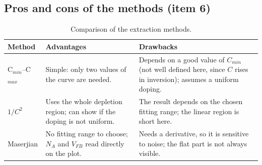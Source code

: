 \subsection{Pros and cons of the methods (item 6)}\label{sec:mis-methods}
\begin{table}[H]
\centering\small
\caption{Comparison of the extraction methods.}\label{tab:methods}
\begin{tabularx}{\linewidth}{p{2.4cm}XX}
\toprule
Method & Advantages & Drawbacks\\
\midrule
C$_{min}$--C$_{max}$ & Simple: only two values of the curve are needed. &
Depends on a good value of $C_{min}$ (not well defined here, since $C$ rises in inversion);
assumes a uniform doping.\\
$1/C^2$ & Uses the whole depletion region; can show if the doping is not uniform. &
The result depends on the chosen fitting range; the linear region is short here.\\
Maserjian & No fitting range to choose; $N_A$ and $V_{FB}$ read directly on the plot. &
Needs a derivative, so it is sensitive to noise; the flat part is not always visible.\\
\bottomrule
\end{tabularx}
\end{table}
